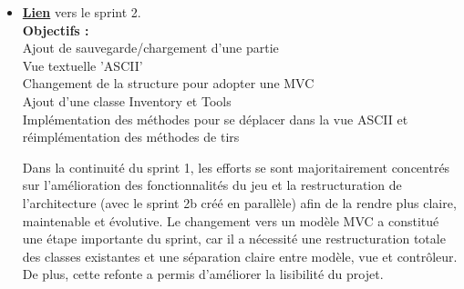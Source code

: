 \documentclass[a4paper, 12pt]{article}
\begin{document}
\begin{itemize}[itemsep=1cm]
                Durant ce sprint, chaque fonctionnalité a été développée dans une branche dédiée, puis intégrée via une MR.
                Les classes essentielles (Guns, Worm, Main, Team, Game) ont été définies dès le début et réparties entre les membres du groupe.
                Elles ont été accompagnées de tests unitaires réalisés avec JUnit 5 pour faciliter la détection d'erreurs.\\

                La gestion des bugs et les ajustements structurels ont été faits tout au long du jalon, permettant de corriger rapidement les problèmes rencontrés et d’améliorer la cohérence de l’architecture.
                Chaque fonctionnalité a fait l’objet d’un ticket, suivi d’une ou plusieurs MR.\\

                En résumé, ce sprint a permis de poser les bases du projet : une bonne architecture, des classes essentielles déjà testées et une première version console jouable.
                Le code JAVA de ce jalon représente une bonne base pour les sprints suivants, où les fonctionnalités seront enrichies sans remettre en cause cette structure.

            \subsection{Sprint 2 : Version console complète (8/11 - 30/11)}
                \item \href{https://moule.informatique.u-paris.fr/mesnildr/projet-worms/-/milestones/3#tab-issues}{\textbf{Lien}} vers le sprint 2.\\
                \newline
                \textbf{Objectifs :}\\
                    Ajout de sauvegarde/chargement d'une partie\\
                    Vue textuelle 'ASCII'\\
                    Changement de la structure pour adopter une MVC\\
                    Ajout d'une classe Inventory et Tools\\
                    Implémentation des méthodes pour se déplacer dans la vue ASCII et réimplémentation des méthodes de tirs
                \newline
                
                Dans la continuité du sprint 1, les efforts se sont majoritairement concentrés sur l'amélioration des fonctionnalités du jeu et la restructuration de l'architecture (avec le sprint 2b créé en parallèle) afin de la rendre plus claire, maintenable et évolutive.
                Le changement vers un modèle MVC a constitué une étape importante du sprint, car il a nécessité une restructuration totale des classes existantes et une séparation claire entre modèle, vue et contrôleur.
                De plus, cette refonte a permis d'améliorer la lisibilité du projet.\\
                

\end{itemize}
\end{document}
